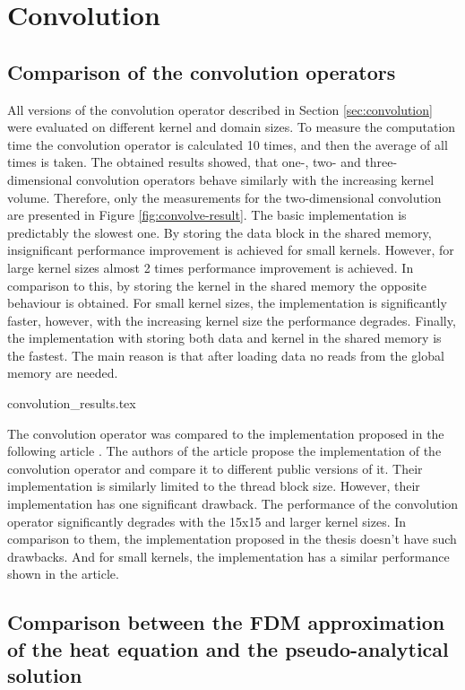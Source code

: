 \section{Convolution}

\subsection{Comparison of the convolution operators}

All versions of the convolution operator described in Section \ref{sec:convolution} were evaluated on different kernel and domain sizes.
To measure the computation time the convolution operator is calculated 10 times, and then the average of all times is taken.
The obtained results showed, that one-, two- and three-dimensional convolution operators behave similarly with the increasing kernel volume.
Therefore, only the measurements for the two-dimensional convolution are presented in Figure \ref{fig:convolve-result}.
The basic implementation is predictably the slowest one.
By storing the data block in the shared memory, insignificant performance improvement is achieved for small kernels.
However, for large kernel sizes almost 2 times performance improvement is achieved.
In comparison to this, by storing the kernel in the shared memory the opposite behaviour is obtained.
For small kernel sizes, the implementation is significantly faster, however, with the increasing kernel size the performance degrades.
Finally, the implementation with storing both data and kernel in the shared memory is the fastest.
The main reason is that after loading data no reads from the global memory are needed.

\newpage

{convolution_results.tex}

The convolution operator was compared to the implementation proposed in the following article \cite{Convolve}.
The authors of the article propose the implementation of the convolution operator and compare it to different public versions of it.
Their implementation is similarly limited to the thread block size.
However, their implementation has one significant drawback.
The performance of the convolution operator significantly degrades with the 15x15 and larger kernel sizes.
In comparison to them, the implementation proposed in the thesis doesn't have such drawbacks.
And for small kernels, the implementation has a similar performance shown in the article.

\subsection{Comparison between the FDM approximation of the heat equation and the pseudo-analytical solution}

